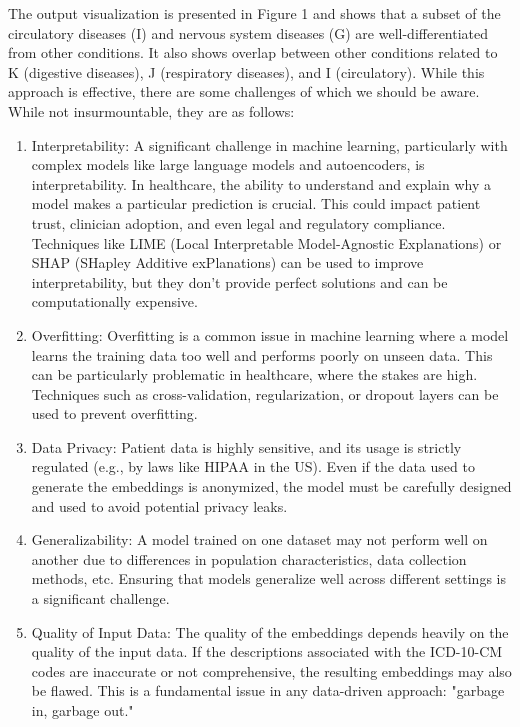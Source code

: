 \documentclass{bmcart}
\begin{document}
\vspace{2mm}

The output visualization is presented in Figure 1 %
and shows that 
a subset of the circulatory diseases (I) and
nervous system diseases (G) are well-differentiated from other conditions. It
also shows overlap between other conditions related to K (digestive diseases), 
J (respiratory diseases), and I (circulatory). While this approach is 
effective, there are some challenges of which we should be aware. While not 
insurmountable, they are as follows:

\begin{enumerate}
\item Interpretability: A significant challenge in machine learning, particularly with complex models like large language models and autoencoders, is interpretability. In healthcare, the ability to understand and explain why a model makes a particular prediction is crucial. This could impact patient trust, clinician adoption, and even legal and regulatory compliance. Techniques like LIME (Local Interpretable Model-Agnostic Explanations) or SHAP (SHapley Additive exPlanations) can be used to improve interpretability, but they don't provide perfect solutions and can be computationally expensive.
\item Overfitting: Overfitting is a common issue in machine learning where a model learns the training data too well and performs poorly on unseen data. This can be particularly problematic in healthcare, where the stakes are high. Techniques such as cross-validation, regularization, or dropout layers can be used to prevent overfitting.
\item Data Privacy: Patient data is highly sensitive, and its usage is strictly regulated (e.g., by laws like HIPAA in the US). Even if the data used to generate the embeddings is anonymized, the model must be carefully designed and used to avoid potential privacy leaks.
\item Generalizability: A model trained on one dataset may not perform well on another due to differences in population characteristics, data collection methods, etc. Ensuring that models generalize well across different settings is a significant challenge.
\item Quality of Input Data: The quality of the embeddings depends heavily on the quality of the input data. If the descriptions associated with the ICD-10-CM codes are inaccurate or not comprehensive, the resulting embeddings may also be flawed. This is a fundamental issue in any data-driven approach: "garbage in, garbage out."

\end{enumerate}
\end{document}
